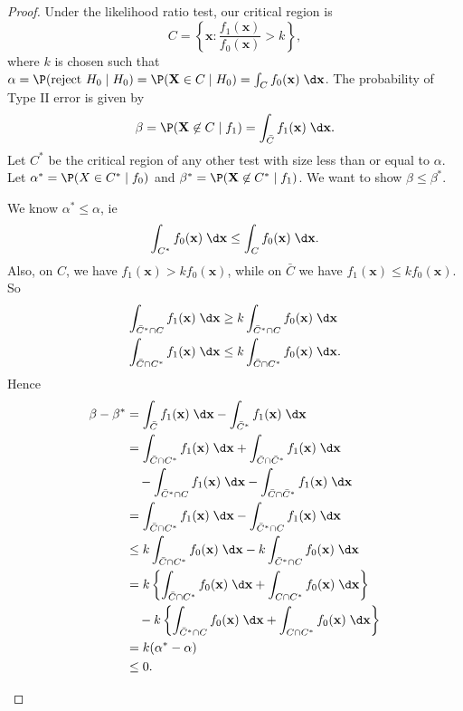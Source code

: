 \documentclass[a4paper]{article}
\begin{document}
\begin{proof}
  Under the likelihood ratio test, our critical region is
  \[
    C = \left\{\mathbf{x}: \frac{f_1(\mathbf{x})}{f_0(\mathbf{x})} > k\right\},
  \]
  where $k$ is chosen such that $\alpha=\P(\text{reject }H_0\mid H_0) = \P(\mathbf{X}\in C\mid H_0) = \int_C f_0(\mathbf{x})\;\d \mathbf{x}$. The probability of Type II error is given by
  \[
    \beta = \P(\mathbf{X}\not\in C\mid f_1) = \int_{\bar C}f_1(\mathbf{x})\;\d \mathbf{x}.
  \]
  Let $C^*$ be the critical region of any other test with size less than or equal to $\alpha$. Let $\alpha^* = \P(X\in C^*\mid f_0)$ and $\beta^* = \P(\mathbf{X}\not\in C^*\mid f_1)$. We want to show $\beta \leq \beta^*$.

  We know $\alpha^* \leq \alpha$, ie
  \[
    \int_{C^*}f_0(\mathbf{x})\;\d \mathbf{x}\leq \int_Cf_0(\mathbf{x}) \;\d \mathbf{x}.
  \]
  Also, on $C$, we have $f_1(\mathbf{x}) > kf_0(\mathbf{x})$, while on $\bar C$ we have $f_1(\mathbf{x}) \leq kf_0(\mathbf{x})$. So
  \begin{align*}
    \int_{\bar C^*\cap C} f_1(\mathbf{x}) \;\d \mathbf{x} &\geq k\int_{\bar C^*\cap C}f_0(\mathbf{x}) \;\d \mathbf{x}\\
    \int_{\bar C\cap C^*}f_1(\mathbf{x}) \;\d \mathbf{x} &\leq k\int_{\bar C\cap C^*}f_0 (\mathbf{x})\;\d \mathbf{x}.
  \end{align*}
  Hence
  \begin{align*}
    \beta - \beta^* &= \int_{\bar C}f_1(\mathbf{x}) \;\d \mathbf{x} - \int_{\bar C^*}f_1(\mathbf{x})\;\d \mathbf{x}\\
    &= \int_{\bar C\cap C^*} f_1(\mathbf{x}) \;\d \mathbf{x} + \int_{\bar C\cap \bar C^*}f_1(\mathbf{x})\;\d \mathbf{x} \\
    &\quad - \int_{\bar C^*\cap C} f_1(\mathbf{x}) \;\d \mathbf{x} - \int_{\bar C\cap \bar C^*}f_1(\mathbf{x})\;\d \mathbf{x}\\
    &= \int_{\bar C \cap C^*}f_1(\mathbf{x})\;\d \mathbf{x} - \int_{\bar C^*\cap C}f_1(\mathbf{x})\;\d \mathbf{x}\\
    &\leq k\int_{\bar C \cap C^*}f_0(\mathbf{x})\;\d \mathbf{x} - k\int_{\bar C^*\cap C}f_0(\mathbf{x})\;\d \mathbf{x}\\
    &= k\left\{\int_{\bar C\cap C^*}f_0(\mathbf{x})\;\d \mathbf{x} + \int_{C \cap C^*}f_0(\mathbf{x})\;\d \mathbf{x}\right\} \\
    &\quad- k\left\{\int_{\bar C^*\cap C}f_0(\mathbf{x})\;\d \mathbf{x} + \int_{C\cap C^*}f_0(\mathbf{x})\;\d \mathbf{x}\right\}\\
    &= k(\alpha^* - \alpha)\\
    &\leq 0.
  \end{align*}
  \begin{center}
\end{center}
\end{proof}
\end{document}
